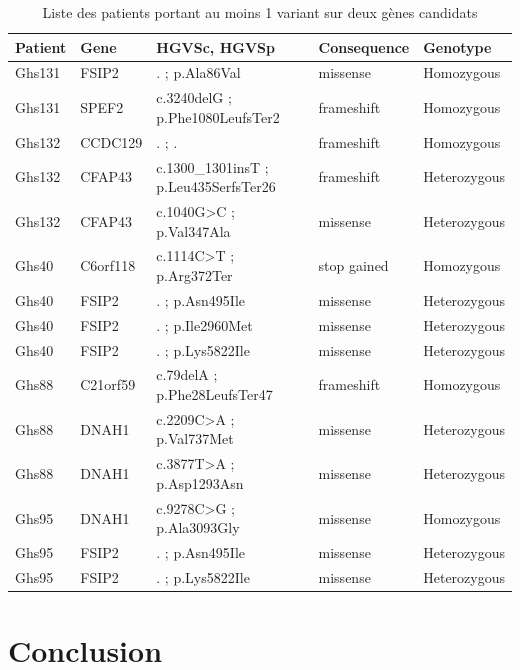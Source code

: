\documentclass[12pt,twoside]{reedthesis}
\theoremstyle{definition}
\theoremstyle{definition}
\theoremstyle{remark}
\begin{document}
  \newpage
  
  \begin{longtable}[t]{lllll}
  \caption{\label{tab:tabtwocandidats}Liste des patients portant au moins 1 variant sur deux gènes candidats}\\
  \toprule
  Patient & Gene & HGVSc, HGVSp & Consequence & Genotype\\
  \midrule
  Ghs131 & FSIP2 & . ; p.Ala86Val & missense & Homozygous\\
  Ghs131 & SPEF2 & c.3240delG ; p.Phe1080LeufsTer2 & frameshift & Homozygous\\
  Ghs132 & CCDC129 & . ; . & frameshift & Homozygous\\
  Ghs132 & CFAP43 & c.1300\_1301insT ; p.Leu435SerfsTer26 & frameshift & Heterozygous\\
  Ghs132 & CFAP43 & c.1040G>C ; p.Val347Ala & missense & Heterozygous\\
  \addlinespace
  Ghs40 & C6orf118 & c.1114C>T ; p.Arg372Ter & stop gained & Homozygous\\
  Ghs40 & FSIP2 & . ; p.Asn495Ile & missense & Heterozygous\\
  Ghs40 & FSIP2 & . ; p.Ile2960Met & missense & Heterozygous\\
  Ghs40 & FSIP2 & . ; p.Lys5822Ile & missense & Heterozygous\\
  Ghs88 & C21orf59 & c.79delA ; p.Phe28LeufsTer47 & frameshift & Homozygous\\
  \addlinespace
  Ghs88 & DNAH1 & c.2209C>A ; p.Val737Met & missense & Heterozygous\\
  Ghs88 & DNAH1 & c.3877T>A ; p.Asp1293Asn & missense & Heterozygous\\
  Ghs95 & DNAH1 & c.9278C>G ; p.Ala3093Gly & missense & Homozygous\\
  Ghs95 & FSIP2 & . ; p.Asn495Ile & missense & Heterozygous\\
  Ghs95 & FSIP2 & . ; p.Lys5822Ile & missense & Heterozygous\\
  \bottomrule
  \end{longtable}
  
  \newpage
  
  \newpage 
  
  \section{Conclusion}\label{conclusion}
  
\end{document}
